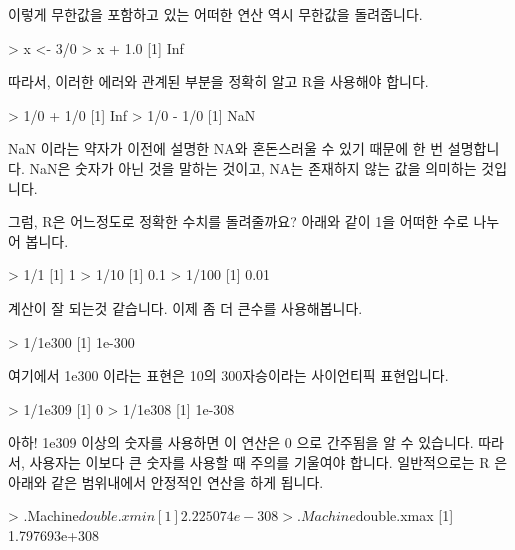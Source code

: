 이렇게 무한값을 포함하고 있는 어떠한 연산 역시 무한값을 돌려줍니다. 

\begin{Schunk}
\begin{Soutput}
> x <- 3/0
> x + 1.0
[1] Inf
\end{Soutput}
\end{Schunk}

따라서, 이러한 에러와 관계된 부분을 정확히 알고 R을 사용해야 합니다. 

\begin{Schunk}
\begin{Soutput}
> 1/0 + 1/0
[1] Inf
> 1/0 - 1/0
[1] NaN
\end{Soutput}
\end{Schunk}

NaN 이라는 약자가 이전에 설명한 NA와 혼돈스러울 수 있기 때문에 한 번 설명합니다. 
NaN은 숫자가 아닌 것을 말하는 것이고, NA는 존재하지 않는 값을 의미하는 것입니다. 

그럼, R은 어느정도로 정확한 수치를 돌려줄까요? 
아래와 같이 1을 어떠한 수로 나누어 봅니다. 

\begin{Schunk}
\begin{Soutput}
> 1/1
[1] 1
> 1/10
[1] 0.1
> 1/100
[1] 0.01
\end{Soutput}
\end{Schunk}

계산이 잘 되는것 같습니다. 
이제 좀 더 큰수를 사용해봅니다. 

\begin{Schunk}
\begin{Soutput}
> 1/1e300
[1] 1e-300
\end{Soutput}
\end{Schunk}

여기에서 1e300 이라는 표현은 10의 300자승이라는 사이언티픽 표현입니다. 

\begin{Schunk}
\begin{Soutput}
> 1/1e309
[1] 0
> 1/1e308
[1] 1e-308
\end{Soutput}
\end{Schunk}

아하! 1e309 이상의 숫자를 사용하면 이 연산은 0 으로 간주됨을 알 수 있습니다. 
따라서, 사용자는 이보다 큰 숫자를 사용할 때 주의를 기울여야 합니다. 
일반적으로는 R 은 아래와 같은 범위내에서 안정적인 연산을 하게 됩니다. 

\begin{Schunk}
\begin{Soutput}
> .Machine$double.xmin
[1] 2.225074e-308
> .Machine$double.xmax
[1] 1.797693e+308
\end{Soutput}
\end{Schunk}


